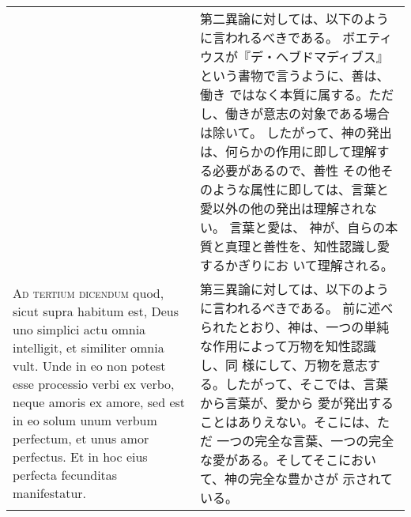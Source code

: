 \documentclass[10pt]{jsarticle} %
\begin{document}
\begin{longtable}{p{21em}p{21em}}
&

第二異論に対しては、以下のように言われるべきである。
ボエティウスが『デ・ヘブドマディブス』という書物で言うように、善は、働き
 ではなく本質に属する。ただし、働きが意志の対象である場合は除いて。
したがって、神の発出は、何らかの作用に即して理解する必要があるので、善性
 その他そのような属性に即しては、言葉と愛以外の他の発出は理解されない。
言葉と愛は、 神が、自らの本質と真理と善性を、知性認識し愛するかぎりにお
 いて理解される。


\\



{\scshape Ad tertium dicendum} quod, sicut supra habitum est, Deus uno simplici
 actu omnia intelligit, et similiter omnia vult. Unde in eo non potest
 esse processio verbi ex verbo, neque amoris ex amore, sed est in eo
 solum unum verbum perfectum, et unus amor perfectus. Et in hoc eius
 perfecta fecunditas manifestatur.

&

第三異論に対しては、以下のように言われるべきである。
前に述べられたとおり、神は、一つの単純な作用によって万物を知性認識し、同
 様にして、万物を意志する。したがって、そこでは、言葉から言葉が、愛から
 愛が発出することはありえない。そこには、ただ
一つの完全な言葉、一つの完全な愛がある。そしてそこにおいて、神の完全な豊かさが
 示されている。




\end{longtable}
\end{document}

